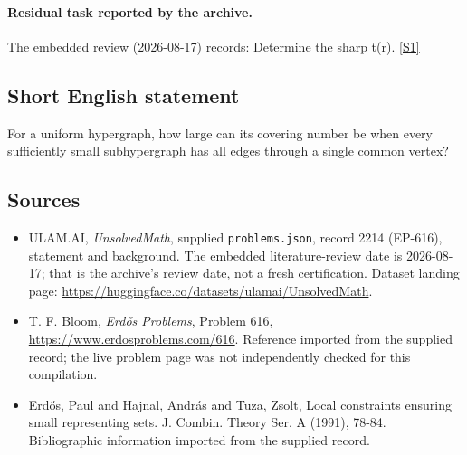 \documentclass[11pt,a4paper]{article}
\newcommand{\sref}[2]{\hyperlink{source:#1:#2}{[S#2]}}
\begin{document}
\paragraph{Residual task reported by the archive.}

The embedded review (2026-08-17) records: Determine the sharp t(r). \sref{2214}{1}

\subsection{Short English statement}

For a uniform hypergraph, how large can its covering number be when every sufficiently small subhypergraph has all edges through a single common vertex?

\subsection{Sources}

{\small

\begin{itemize}

\item[\hypertarget{source:2214:1}{S1}] ULAM.AI, \emph{UnsolvedMath}, supplied \texttt{problems.json}, record 2214 (EP-616), statement and background. The embedded literature-review date is 2026-08-17; that is the archive’s review date, not a fresh certification. Dataset landing page: \url{https://huggingface.co/datasets/ulamai/UnsolvedMath}.

\item[\hypertarget{source:2214:2}{S2}] T. F. Bloom, \emph{Erdős Problems}, Problem 616, \url{https://www.erdosproblems.com/616}. Reference imported from the supplied record; the live problem page was not independently checked for this compilation.

\item[\hypertarget{source:2214:3}{S3}] Erd\H{o}s, Paul and Hajnal, Andr\'{a}s and Tuza, Zsolt, Local constraints ensuring small representing sets. J. Combin. Theory Ser. A (1991), 78-84. Bibliographic information imported from the supplied record.

\end{itemize}

}

\label{end:2214}
\end{document}
